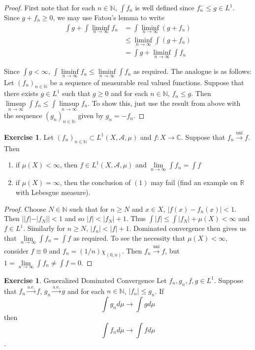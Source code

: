 \documentclass[12pt]{amsart}
\theoremstyle{definition}
\newtheorem{ex}[definition]{Exercise}
\newcommand{\C}{\mathbb{C}}
\newcommand{\N}{\mathbb{N}}
\newcommand{\R}{\mathbb{R}}
\newcommand{\MA}{\mathcal{A}}
\newcommand{\limfn}{\liminf \limits_{n \rightarrow \infty}}
\newcommand{\limpn}{\limsup \limits_{n \rightarrow \infty}}
\newcommand{\limn}{\lim \limits_{n \rightarrow \infty}}
\newcommand{\lex}[1]{\label{ex:#1}}
\begin{document}
	\begin{proof}
		First note that for each $n \in \N$, $\int f_n$ is well defined since $f_n^- \leq g \in L^1$. Since $g + f_n \geq 0$, we may use Fatou's lemma to write
		\begin{align*}
			\int g + \int \limfn f_n
			&= \int \limfn (g+f_n) \\
			& \leq \limfn \int (g + f_n)\\
			&= \int g + \limfn \int f_n
		\end{align*}
		
		Since $\int g < \infty$, $\int \limfn f_n \leq \limfn \int f_n$ as required. The analogue is as follows: Let $(f_n)_{n \in \N}$ be a sequence of measurable real valued functions. Suppose that there exists $g \in L^1$ such that $g \geq 0$ and for each $n \in \N$, $f_n \leq g$. Then $\limpn \int f_n \leq \int \limpn f_n$. To show this, just use the result from above with the sequence $(g_n)_{n \in \N}$ given by $g_n = -f_n$.
		
	\end{proof}
	
	\begin{ex} \lex{00000} 
		Let $(f_n)_{n \in \N} \subset L^1(X, \MA, \mu)$ and $f:X \rightarrow \C$. Suppose that $f_n \xrightarrow{\text{uni}} f$. Then 
		\begin{enumerate}
			\item if $\mu(X) < \infty$, then $f \in L^1(X, \MA, \mu)$ and $\limn \int f_n = \int f$
			\item if $\mu(X) = \infty$, then the conclusion of $(1)$ may fail (find an example on $\R$ with Lebesgue measure).
		\end{enumerate}
	\end{ex}
	
	\begin{proof}
		Choose $N \in \N$ such that for $n \geq N$ and $x \in X$, $|f(x) - f_n(x)| < 1$. Then $||f| - |f_N|| < 1$ and so $|f| < |f_N| +1$. Thus $\int |f| \leq \int |f_N| +\mu(X) < \infty$ and $f \in L^1$. Similarly for $n \geq N$, $|f_n| < |f|+ 1$. Dominated convergence then gives us that $\limn \int f_n = \int f$ as required. To see the necessity that $\mu(X) < \infty$, consider $f \equiv 0$ and $f_n = (1/n) \chi_{(0,n)}$. Then $f_n \xrightarrow{\text{uni}} f$, but $1 = \limn \int f_n \neq \int f = 0$.  
	\end{proof}
	
	\begin{ex} \lex{00000} {Generalized Dominated Convergence}
		Let $f_n,g_n,f,g \in L^1$. Suppose that $f_n \xrightarrow{\text{a.e.}} f$, $g_n \xrightarrow{\text{a.e.}} g$ and for each $n \in \N$, $|f_n| \leq g_n$. If $$\int g_n d\mu \rightarrow \int g d\mu $$ then $$\int f_n d\mu \rightarrow \int f d\mu$$.
	\end{ex}
	
\end{document}
